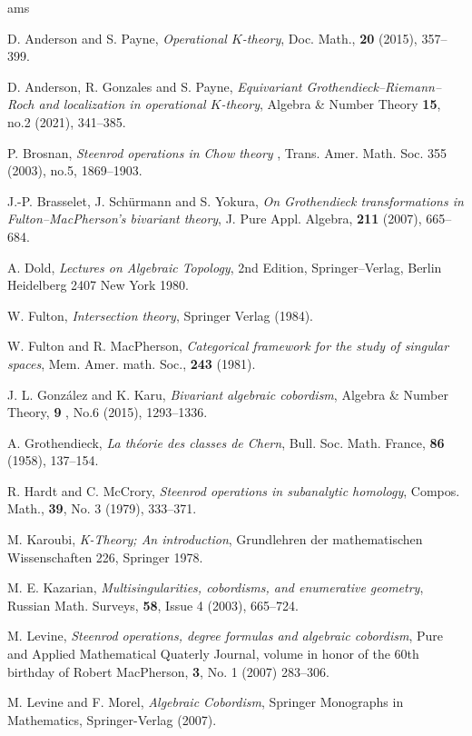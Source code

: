 \documentclass[a4paper]{amsart}
\begin{document}
\begin{thebibliography}{ams}

 D. Anderson and S. Payne, {\it Operational $K$-theory},  Doc. Math., {\bf 20} (2015), 357--399.

 D. Anderson, R. Gonzales and S. Payne, {\it Equivariant Grothendieck--Riemann--Roch and localization in operational $K$-theory}, Algebra \& Number Theory {\bf 15}, no.2 (2021), 341--385.

 P. Brosnan, {\it Steenrod operations in Chow theory}
, Trans. Amer. Math. Soc. 355 (2003), no.5, 1869--1903.

  J.-P. Brasselet, J. Sch\"urmann and S. Yokura, {\it On Grothendieck transformations in Fulton--MacPherson's bivariant theory}, J. Pure Appl. Algebra, {\bf 211} (2007), 665--684.

 A. Dold, {\it Lectures on Algebraic Topology}, 2nd Edition, Springer--Verlag, Berlin Heidelberg 2407 New York 1980.

W. Fulton, {\it Intersection theory}, Springer Verlag (1984).
  
W. Fulton and R. MacPherson, {\it Categorical framework for the study of  
  singular spaces},  Mem. Amer. math. Soc., {\bf 243} (1981).
  
J. L. Gonz\'alez and K. Karu, {\it Bivariant algebraic cobordism}, Algebra \& Number Theory, {\bf 9} , No.6 (2015), 1293--1336.

 A. Grothendieck, {\it La  th\'eorie des classes de Chern}, Bull. Soc. Math. France, {\bf 86} (1958), 137--154.

 R. Hardt and C. McCrory, {\it Steenrod operations in subanalytic homology}, Compos. Math., {\bf 39}, No. 3 (1979), 333--371.

 M. Karoubi, {\it K-Theory; An introduction}, Grundlehren der mathematischen Wissenschaften 226, Springer 1978. 
 
 M. E. Kazarian, {\it Multisingularities, cobordisms, and enumerative geometry}, Russian Math. Surveys, {\bf 58}, Issue 4 (2003), 665--724.

M. Levine, {\it Steenrod operations, degree formulas and algebraic cobordism}, Pure and Applied Mathematical Quaterly Journal, volume in honor of the 60th birthday of Robert MacPherson, {\bf 3}, No. 1 (2007) 283--306.

M. Levine and F. Morel,
{\it Algebraic Cobordism},
Springer Monographs in Mathematics, Springer-Verlag (2007).


\end{thebibliography}
\end{document}
